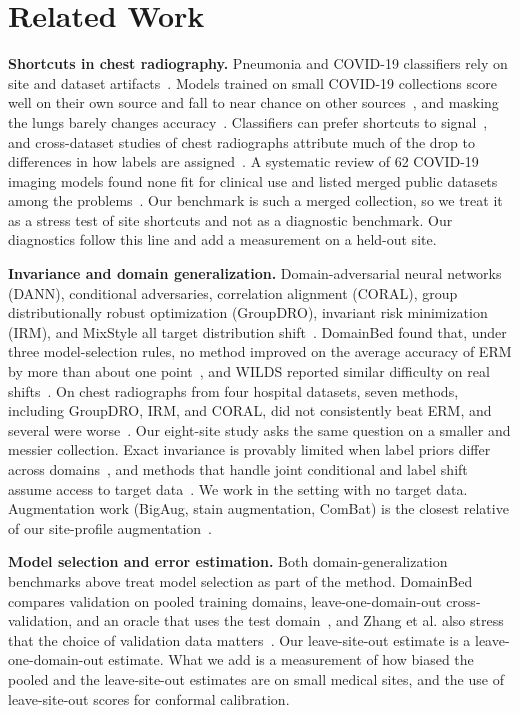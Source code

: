 \documentclass[journal]{IEEEtran}
\newcommand{\erm}{ERM}
\begin{document}
\section{Related Work}\label{sec:related}
\textbf{Shortcuts in chest radiography.} Pneumonia and COVID-19 classifiers rely on site and dataset artifacts~\cite{zech2018variable,pooch2020can}. Models trained on small COVID-19 collections score well on their own source and fall to near chance on other sources~\cite{tartaglione2020unveiling}, and masking the lungs barely changes accuracy~\cite{maguolo2021critic}. Classifiers can prefer shortcuts to signal~\cite{degrave2021ai}, and cross-dataset studies of chest radiographs attribute much of the drop to differences in how labels are assigned~\cite{cohen2020limits}. A systematic review of 62 COVID-19 imaging models found none fit for clinical use and listed merged public datasets among the problems~\cite{roberts2021common}. Our benchmark is such a merged collection, so we treat it as a stress test of site shortcuts and not as a diagnostic benchmark. Our diagnostics follow this line and add a measurement on a held-out site.

\textbf{Invariance and domain generalization.} Domain-adversarial neural networks (DANN), conditional adversaries, correlation alignment (CORAL), group distributionally robust optimization (GroupDRO), invariant risk minimization (IRM), and MixStyle all target distribution shift~\cite{ganin2016domain,long2018conditional,sun2016deep,sagawa2020distributionally,arjovsky2019invariant,zhou2021domain}. DomainBed found that, under three model-selection rules, no method improved on the average accuracy of \erm{} by more than about one point~\cite{gulrajani2021in}, and WILDS reported similar difficulty on real shifts~\cite{koh2021wilds}. On chest radiographs from four hospital datasets, seven methods, including GroupDRO, IRM, and CORAL, did not consistently beat \erm{}, and several were worse~\cite{zhang2021empirical}. Our eight-site study asks the same question on a smaller and messier collection. Exact invariance is provably limited when label priors differ across domains~\cite{zhao2019learning}, and methods that handle joint conditional and label shift assume access to target data~\cite{liu2021adversarial,lipton2018detecting}. We work in the setting with no target data. Augmentation work (BigAug, stain augmentation, ComBat) is the closest relative of our site-profile augmentation~\cite{zhang2020generalizing,tellez2019quantifying,johnson2007adjusting}.

\textbf{Model selection and error estimation.} Both domain-generalization benchmarks above treat model selection as part of the method. DomainBed compares validation on pooled training domains, leave-one-domain-out cross-validation, and an oracle that uses the test domain~\cite{gulrajani2021in}, and Zhang et al. also stress that the choice of validation data matters~\cite{zhang2021empirical}. Our leave-site-out estimate is a leave-one-domain-out estimate. What we add is a measurement of how biased the pooled and the leave-site-out estimates are on small medical sites, and the use of leave-site-out scores for conformal calibration.
\end{document}
